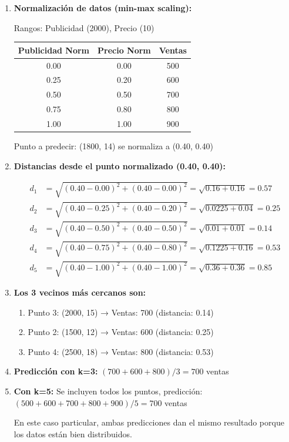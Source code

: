 \documentclass[12pt]{article}
\begin{document}
\begin{enumerate}
    \item \textbf{Normalización de datos (min-max scaling):}
    
    Rangos: Publicidad (2000), Precio (10)
    
    \begin{table}[H]
        \centering
        \begin{tabular}{ccc}
            \toprule
            \textbf{Publicidad Norm} & \textbf{Precio Norm} & \textbf{Ventas} \\
            \midrule
            0.00 & 0.00 & 500 \\
            0.25 & 0.20 & 600 \\
            0.50 & 0.50 & 700 \\
            0.75 & 0.80 & 800 \\
            1.00 & 1.00 & 900 \\
            \bottomrule
        \end{tabular}
    \end{table}
    
    Punto a predecir: (1800, 14) se normaliza a (0.40, 0.40)
    
    \item \textbf{Distancias desde el punto normalizado (0.40, 0.40):}
    
    \begin{align*}
        d_1 &= \sqrt{(0.40-0.00)^2 + (0.40-0.00)^2} = \sqrt{0.16 + 0.16} = 0.57 \\
        d_2 &= \sqrt{(0.40-0.25)^2 + (0.40-0.20)^2} = \sqrt{0.0225 + 0.04} = 0.25 \\
        d_3 &= \sqrt{(0.40-0.50)^2 + (0.40-0.50)^2} = \sqrt{0.01 + 0.01} = 0.14 \\
        d_4 &= \sqrt{(0.40-0.75)^2 + (0.40-0.80)^2} = \sqrt{0.1225 + 0.16} = 0.53 \\
        d_5 &= \sqrt{(0.40-1.00)^2 + (0.40-1.00)^2} = \sqrt{0.36 + 0.36} = 0.85
    \end{align*}
    
    \item \textbf{Los 3 vecinos más cercanos son:}
    \begin{enumerate}
        \item Punto 3: (2000, 15) → Ventas: 700 (distancia: 0.14)
        \item Punto 2: (1500, 12) → Ventas: 600 (distancia: 0.25)
        \item Punto 4: (2500, 18) → Ventas: 800 (distancia: 0.53)
    \end{enumerate}
    
    \item \textbf{Predicción con k=3:} $(700 + 600 + 800) / 3 = 700$ ventas
    
    \item \textbf{Con k=5:} Se incluyen todos los puntos, predicción: $(500 + 600 + 700 + 800 + 900) / 5 = 700$ ventas
    
    En este caso particular, ambas predicciones dan el mismo resultado porque los datos están bien distribuidos.
\end{enumerate}
\end{document}
